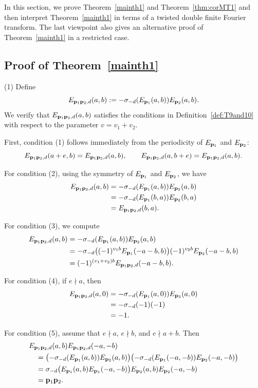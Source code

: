 \documentclass[a4paper, 11pt]{amsart}
\theoremstyle{plain}
\theoremstyle{definition}
\numberwithin{equation}{section}
\begin{document}
In this section, we prove Theorem~\ref{mainth1} and Theorem~\ref{thm:corMT1} and then interpret Theorem~\ref{mainth1} in terms of a twisted double finite Fourier transform. 
The last viewpoint also gives an alternative proof of Theorem~\ref{mainth1} in a restricted case.
\subsection{Proof of Theorem~\ref{mainth1}}

(1) Define
\[
E_{{\bf p}_1{\bf p}_2,d}(a,b)
:=
-\sigma_{-d}(E_{{\bf p}_1}(a,b))E_{{\bf p}_2}(a,b).
\]
We verify that $E_{{\bf p}_1{\bf p}_2,d}(a,b)$ satisfies the conditions
in Definition~\ref{def:T9and10} with respect to the parameter $v=v_1+v_2$.

First, condition (1) follows immediately from the periodicity of
$E_{{\bf p}_1}$ and $E_{{\bf p}_2}$:
\[
E_{{\bf p}_1{\bf p}_2,d}(a+e,b)
=
E_{{\bf p}_1{\bf p}_2,d}(a,b),
\qquad
E_{{\bf p}_1{\bf p}_2,d}(a,b+e)
=
E_{{\bf p}_1{\bf p}_2,d}(a,b).
\]

For condition (2), using the symmetry of $E_{{\bf p}_1}$ and
$E_{{\bf p}_2}$, we have
\[
\begin{aligned}
E_{{\bf p}_1{\bf p}_2,d}(a,b)
&=
-\sigma_{-d}(E_{{\bf p}_1}(a,b))E_{{\bf p}_2}(a,b)\\
&=
-\sigma_{-d}(E_{{\bf p}_1}(b,a))E_{{\bf p}_2}(b,a)\\
&=
E_{{\bf p}_1{\bf p}_2,d}(b,a).
\end{aligned}
\]

For condition (3), we compute
\[
\begin{aligned}
E_{{\bf p}_1{\bf p}_2,d}(a,b)
&=
-\sigma_{-d}(E_{{\bf p}_1}(a,b))E_{{\bf p}_2}(a,b)\\
&=
-\sigma_{-d}\bigl((-1)^{v_1b}E_{{\bf p}_1}(-a-b,b)\bigr)
  (-1)^{v_2b}E_{{\bf p}_2}(-a-b,b)\\
&=
(-1)^{(v_1+v_2)b}
E_{{\bf p}_1{\bf p}_2,d}(-a-b,b).
\end{aligned}
\]

For condition (4), if $e\nmid a$, then
\[
\begin{aligned}
E_{{\bf p}_1{\bf p}_2,d}(a,0)
&=
-\sigma_{-d}(E_{{\bf p}_1}(a,0))E_{{\bf p}_2}(a,0)\\
&=
-\sigma_{-d}(-1)(-1)\\
&=
-1.
\end{aligned}
\]

For condition (5), assume that $e\nmid a$, $e\nmid b$, and
$e\nmid a+b$. Then
\[
\begin{aligned}
&E_{{\bf p}_1{\bf p}_2,d}(a,b)
 E_{{\bf p}_1{\bf p}_2,d}(-a,-b)\\
&\quad=
\bigl(-\sigma_{-d}(E_{{\bf p}_1}(a,b))E_{{\bf p}_2}(a,b)\bigr)
\bigl(-\sigma_{-d}(E_{{\bf p}_1}(-a,-b))E_{{\bf p}_2}(-a,-b)\bigr)\\
&\quad=
\sigma_{-d}\bigl(E_{{\bf p}_1}(a,b)E_{{\bf p}_1}(-a,-b)\bigr)
E_{{\bf p}_2}(a,b)E_{{\bf p}_2}(-a,-b)\\
&\quad=
{\bf p}_1{\bf p}_2.
\end{aligned}
\]
\end{document}
